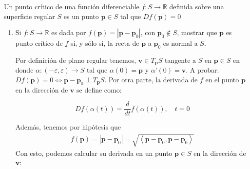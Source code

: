 \begin{problema}
    Un punto crítico de una función diferenciable $f: S \rightarrow \mathbb{R}$ definida sobre una superficie regular $S$ es un punto $\mathbf{p}\in S$ tal que $Df(\mathbf{p})=0$
    \begin{enumerate}
        \item Si $f: S \rightarrow \mathbb{R}$ es dada por $f(\mathbf{p})=\left|\mathbf{p}-\mathbf{p}_{0}\right|$, con $\mathbf{p}_{0} \notin S$, mostrar que $\mathbf{p}$ es punto crítico de $f$ si, y sólo si, la recta de $\mathbf{p}$ a $\mathbf{p}_{0}$ es normal a $S$.
        \begin{dem}
            Por definición de plano regular tenemos, $\mathbf{v}\in T_{\mathbf{p}}S$ tangente a $S$ en $\mathbf{p}\in S$ en donde $\alpha: (-\varepsilon, \varepsilon)\rightarrow S$ tal que $\alpha(0)=\mathbf{p}$ y $\alpha’(0)=\mathbf{v}$. A probar: $Df(\mathbf{p})=0 \iff \mathbf{p}-\mathbf{p}_0 \perp T_\mathbf{p} S$. Por otra parte, la derivada de $f$ en el punto $\mathbf{p}$ en la dirección de $\mathbf{v}$ se define como:

$$Df(\alpha(t)) =\frac{d}{dt}f(\alpha(t)),\quad t=0 $$

Además, tenemos por hipótesis que 
\begin{align*}
    f(\mathbf{p})=\left|\mathbf{p}-\mathbf{p}_{0}\right| =\sqrt{\left\langle\mathbf{p}-\mathbf{p}_{0}, \mathbf{p}-\mathbf{p}_{0}\right\rangle}
\end{align*}
 Con esto, podemos calcular su derivada en un punto $\mathbf{p} \in S$ en la dirección de $\mathbf{v}$:


\end{dem}
\end{enumerate}
\end{problema}
